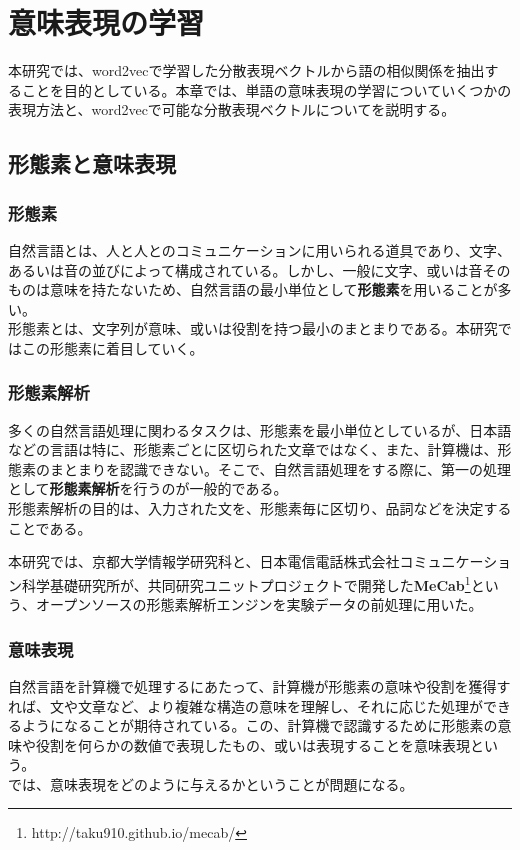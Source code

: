 \chapter{意味表現の学習}
本研究では、word2vecで学習した分散表現ベクトルから語の相似関係を抽出することを目的としている。本章では、単語の意味表現の学習についていくつかの表現方法と、word2vecで可能な分散表現ベクトルについてを説明する。

\section{形態素と意味表現}
\subsection{形態素}
自然言語とは、人と人とのコミュニケーションに用いられる道具であり、文字、あるいは音の並びによって構成されている。しかし、一般に文字、或いは音そのものは意味を持たないため、自然言語の最小単位として\textbf{形態素}を用いることが多い。\\
形態素とは、文字列が意味、或いは役割を持つ最小のまとまりである。本研究ではこの形態素に着目していく。

\subsection{形態素解析}
多くの自然言語処理に関わるタスクは、形態素を最小単位としているが、日本語などの言語は特に、形態素ごとに区切られた文章ではなく、また、計算機は、形態素のまとまりを認識できない。そこで、自然言語処理をする際に、第一の処理として\textbf{形態素解析}を行うのが一般的である。\\
形態素解析の目的は、入力された文を、形態素毎に区切り、品詞などを決定することである。

本研究では、京都大学情報学研究科と、日本電信電話株式会社コミュニケーション科学基礎研究所が、共同研究ユニットプロジェクトで開発した\textbf{MeCab}\footnote{http://taku910.github.io/mecab/}という、オープンソースの形態素解析エンジンを実験データの前処理に用いた。

\subsection{意味表現}
自然言語を計算機で処理するにあたって、計算機が形態素の意味や役割を獲得すれば、文や文章など、より複雑な構造の意味を理解し、それに応じた処理ができるようになることが期待されている。この、計算機で認識するために形態素の意味や役割を何らかの数値で表現したもの、或いは表現することを意味表現という。\\
では、意味表現をどのように与えるかということが問題になる。

